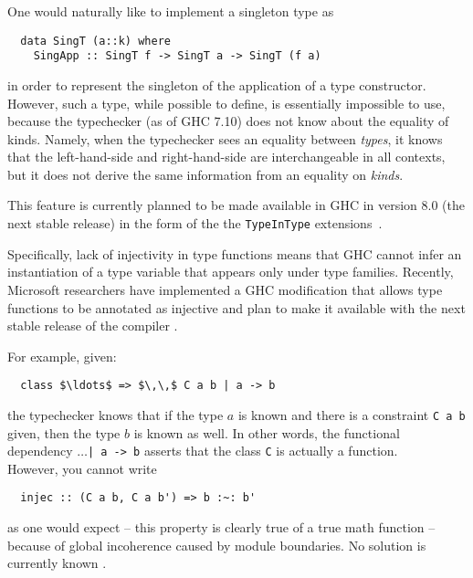 \begin{description}[leftmargin=1em]
\item[No kind equality] 
  One would naturally like to implement a singleton type as
  \begin{lstlisting}
  data SingT (a::k) where
    SingApp :: SingT f -> SingT a -> SingT (f a) 
  \end{lstlisting}
  in order to represent the singleton of the application of a type
  constructor.  However, such a type, while possible to define, is essentially
  impossible to use, because the typechecker (as of GHC 7.10) does not know
  about the equality of kinds. Namely, when the typechecker sees an equality
  between \emph{types}, it knows that the left-hand-side and right-hand-side
  are interchangeable in all contexts, but it does not derive the same
  information from an equality on \emph{kinds}.
  
  This feature is currently planned to be made available in GHC in version 8.0
  (the next stable release) in the form of the the \texttt{TypeInType}
  extensions~\cite{typeintype}.

\item[Non-injective type families] 
  Specifically, lack of injectivity in type functions means that GHC cannot infer
  an instantiation of a type variable that appears only under type
  families. Recently, Microsoft researchers have implemented a GHC modification
  that allows type functions to be annotated as injective and plan to make it
  available with the next stable release of the compiler \cite{microsoft}.

\item[Functional dependencies are \emph{not} equivalent to type families] 
  For example, given:
  \begin{lstlisting}
  class $\ldots$ => $\,\,$ C a b | a -> b
  \end{lstlisting}
  the typechecker knows that if the type $a$ is known and there is a constraint
  \lstinline{C a b} given, then the type $b$ is known as well. In other words, the functional 
  dependency $\ldots$\lstinline{| a -> b} asserts that the class \lstinline{C} is
  actually a function. \\ 
  However, you cannot write
  \begin{lstlisting}
  injec :: (C a b, C a b') => b :~: b' 
  \end{lstlisting}
  as one would expect -- this property is clearly true of a true math function --
  because of global incoherence caused by module boundaries. No solution 
  is currently known \cite{sof}.


\end{description}

